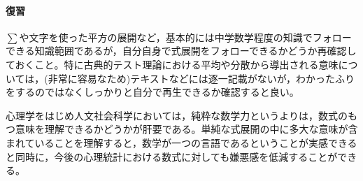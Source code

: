 \paragraph{復習}
$\sum$や文字を使った平方の展開など，基本的には中学数学程度の知識でフォローできる知識範囲であるが，自分自身で式展開をフォローできるかどうか再確認しておくこと。特に古典的テスト理論における平均や分散から導出される意味については，(非常に容易なため)テキストなどには逐一記載がないが，わかったふりをするのではなくしっかりと自分で再生できるか確認すると良い。

心理学をはじめ人文社会科学においては，純粋な数学力というよりは，数式のもつ意味を理解できるかどうかが肝要である。単純な式展開の中に多大な意味が含まれていることを理解すると，数学が一つの言語であるということが実感できると同時に，今後の心理統計における数式に対しても嫌悪感を低減することができる。
